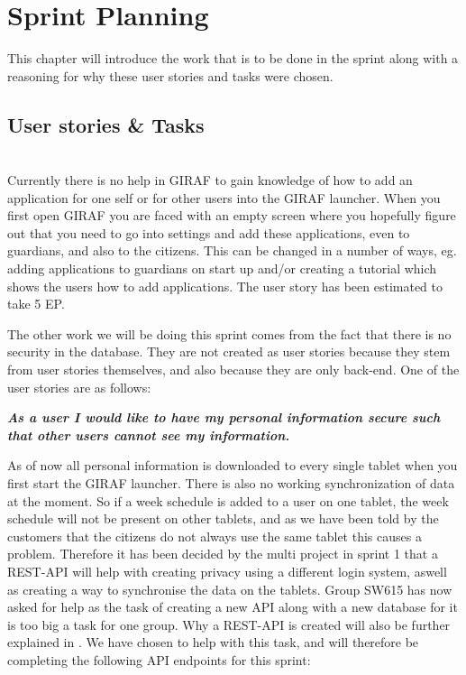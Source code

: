 \chapter{Sprint Planning}
This chapter will introduce the work that is to be done in the sprint along with a reasoning for why these user stories and tasks were chosen.

\section{User stories \& Tasks}
\begin{description}[style=unboxed]
    \item[{[}\phigh{]} As a guardian I would like the launcher to tell me how to add applications if none are active, such that it is easier to add applications for beginners.] \hfill \\ 
    Currently there is no help in GIRAF to gain knowledge of how to add an application for one self or for other users into the GIRAF launcher.
    When you first open GIRAF you are faced with an empty screen where you hopefully figure out that you need to go into settings and add these applications, even to guardians, and also to the citizens.
    This can be changed in a number of ways, eg. adding applications to guardians on start up and/or creating a tutorial which shows the users how to add applications.
    The user story has been estimated to take 5 EP.
\end{description}
The other work we will be doing this sprint comes from the fact that there is no security in the database.
They are not created as user stories because they stem from user stories themselves, and also because they are only back-end.
One of the user stories are as follows:

\textbf{\textit{As a user I would like to have my personal information secure such that other users cannot see my information.}}

As of now all personal information is downloaded to every single tablet when you first start the GIRAF launcher.
There is also no working synchronization of data at the moment. 
So if a week schedule is added to a user on one tablet, the week schedule will not be present on other tablets, and as we have been told by the customers that the citizens do not always use the same tablet this causes a problem.
Therefore it has been decided by the multi project in sprint 1 that a REST-API will help with creating privacy using a different login system, aswell as creating a way to synchronise the data on the tablets.
Group SW615 has now asked for help as the task of creating a new API along with a new database for it is too big a task for one group.
Why a REST-API is created will also be further explained in .
We have chosen to help with this task, and will therefore be completing the following API endpoints for this sprint: 

